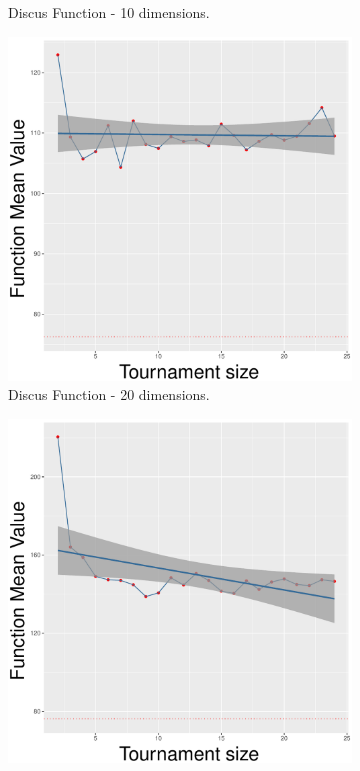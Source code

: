 \begin{figure}[!t]
\begin{subfigure}[b]{0.33\textwidth}
		\caption{Discus Function - 10 dimensions.}
	\end{subfigure}
	\begin{subfigure}[b]{0.33\textwidth}
		\centering
		\includegraphics[width=\textwidth]{img/uniform-20D/unimodal_uniform_11_dim_20.pdf}
		\caption{Discus Function - 20 dimensions.}
	\end{subfigure}
	\begin{subfigure}[b]{0.33\textwidth}
		\centering
		\includegraphics[width=\textwidth]{img/uniform-40D/unimodal_uniform_11_dim_40.pdf}

\end{subfigure}
\end{figure}
